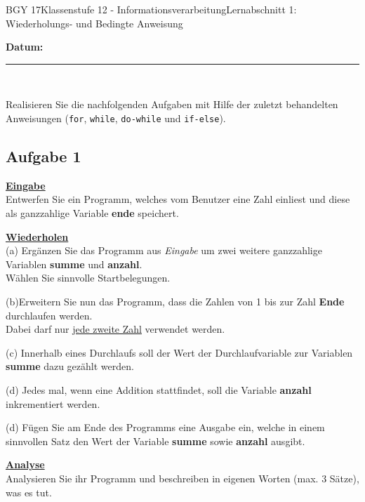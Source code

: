 \documentclass[oneside,openany,headings=optiontotoc,11pt,numbers=noenddot]{scrreprt}
\begin{document}
	\begin{worksheet}{BGY 17}{Klassenstufe 12 - Informationsverarbeitung}{Lernabschnitt 1: Wiederholungs- und Bedingte Anweisung}
				
		\noindent
		\sffamily
		\textbf{Datum:}
		\rule{0.91\textwidth}{0.4pt}\\
		\par\noindent
		Realisieren Sie die nachfolgenden Aufgaben mit Hilfe der zuletzt behandelten Anweisungen (\lstinline[style=JavaInputStyle]{for}, \lstinline[style=JavaInputStyle]{while}, \lstinline[style=JavaInputStyle]{do-while} und \lstinline[style=JavaInputStyle]{if-else}).
		\begin{framed}
			\section*{Aufgabe 1}
			\textbf{\underline{Eingabe}}\\
			Entwerfen Sie ein Programm, welches vom Benutzer eine Zahl einliest und diese als ganzzahlige Variable \textbf{ende} speichert.
			\par\bigskip\noindent
			\textbf{\underline{Wiederholen}}\\
			(a) Ergänzen Sie das Programm aus \textit{Eingabe} um zwei weitere ganzzahlige Variablen \textbf{summe} und \textbf{anzahl}.\\
			Wählen Sie sinnvolle Startbelegungen.\\
			\par\noindent
			(b)Erweitern Sie nun das Programm, dass die Zahlen von 1 bis zur Zahl \textbf{Ende} durchlaufen werden.\\
			Dabei darf nur \underline{jede zweite Zahl} verwendet werden.\\
			\par\noindent
			(c) Innerhalb eines Durchlaufs soll der Wert der Durchlaufvariable zur Variablen \textbf{summe} dazu gezählt werden.\\
			\par\noindent
			(d) Jedes mal, wenn eine Addition stattfindet, soll die Variable \textbf{anzahl} inkrementiert werden.\\
			\par\noindent
			(d) Fügen Sie am Ende des Programms eine Ausgabe ein, welche in einem sinnvollen Satz den Wert der Variable \textbf{summe} sowie \textbf{anzahl} ausgibt.
			\par\bigskip\noindent
			\textbf{\underline{Analyse}}\\
			Analysieren Sie ihr Programm und beschreiben in eigenen Worten (max. 3 Sätze), was es tut.
		\end{framed}
		\newpage
		\begin{framed}

\end{framed}
\end{worksheet}
\end{document}
